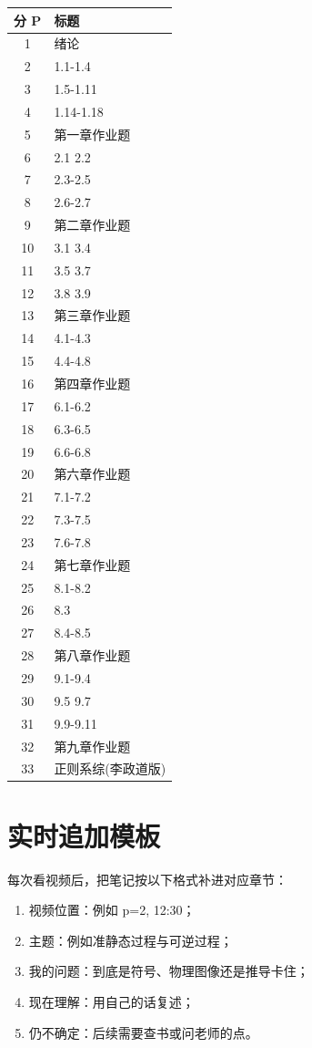 \begin{longtable}{c p{}}
\toprule
分 P & 标题 \\
\midrule
1 & 绪论 \\
2 & 1.1-1.4 \\
3 & 1.5-1.11 \\
4 & 1.14-1.18 \\
5 & 第一章作业题 \\
6 & 2.1 2.2 \\
7 & 2.3-2.5 \\
8 & 2.6-2.7 \\
9 & 第二章作业题 \\
10 & 3.1 3.4 \\
11 & 3.5 3.7 \\
12 & 3.8 3.9 \\
13 & 第三章作业题 \\
14 & 4.1-4.3 \\
15 & 4.4-4.8 \\
16 & 第四章作业题 \\
17 & 6.1-6.2 \\
18 & 6.3-6.5 \\
19 & 6.6-6.8 \\
20 & 第六章作业题 \\
21 & 7.1-7.2 \\
22 & 7.3-7.5 \\
23 & 7.6-7.8 \\
24 & 第七章作业题 \\
25 & 8.1-8.2 \\
26 & 8.3 \\
27 & 8.4-8.5 \\
28 & 第八章作业题 \\
29 & 9.1-9.4 \\
30 & 9.5 9.7 \\
31 & 9.9-9.11 \\
32 & 第九章作业题 \\
33 & 正则系综(李政道版) \\
\bottomrule
\end{longtable}

\section{实时追加模板}

每次看视频后，把笔记按以下格式补进对应章节：
\begin{enumerate}
  \item 视频位置：例如 p=2, 12:30；
  \item 主题：例如准静态过程与可逆过程；
  \item 我的问题：到底是符号、物理图像还是推导卡住；
  \item 现在理解：用自己的话复述；
  \item 仍不确定：后续需要查书或问老师的点。
\end{enumerate}
